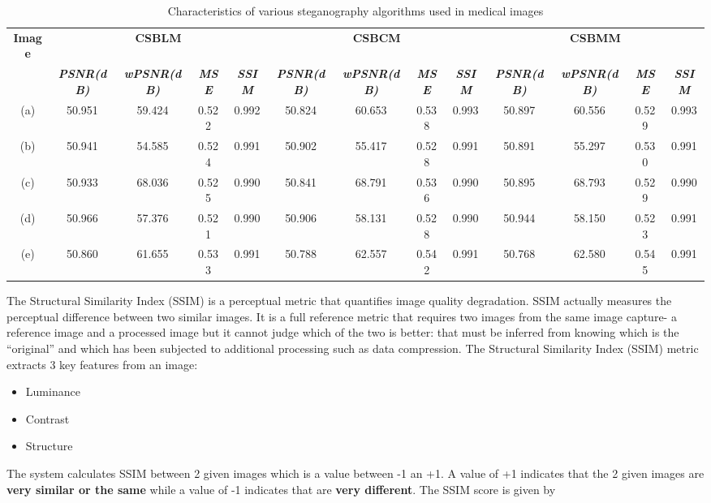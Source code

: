 \documentclass[conference]{IEEEtran}
\begin{document}
\begin{table}[htbp]
	\caption{Characteristics of various steganography algorithms used in medical images}
	\centering
		\begin{tabular}{ |c|c|c|c|c|c|c|c|c|c|c|c|c| }
			\hline
			\textbf{Image}&\multicolumn{4}{|c|}{\textbf{CSBLM}}&\multicolumn{4}{|c|}{\textbf{CSBCM}}&\multicolumn{4}{|c|}{\textbf{CSBMM}}\\
			\cline{2-13}
			\textbf{} & \textbf{\textit{PSNR(dB)}}& \textbf{\textit{wPSNR(dB)}}& \textbf{\textit{MSE}}& \textbf{\textit{SSIM}}& \textbf{\textit{PSNR(dB)}}& \textbf{\textit{wPSNR(dB)}}& \textbf{\textit{MSE}} & \textbf{\textit{SSIM}} & \textbf{\textit{PSNR(dB)}}& \textbf{\textit{wPSNR(dB)}}& \textbf{\textit{MSE}} & \textbf{\textit{SSIM}} \\
			\hline
			(a) & 50.951 & 59.424 & 0.522 & 0.992 & 50.824 & 60.653 & 0.538 & 0.993 & 50.897 & 60.556 &	0.529 & 0.993\\
			(b) & 50.941 & 54.585 &	0.524 & 0.991 & 50.902 & 55.417	& 0.528 & 0.991 & 50.891 & 55.297	& 0.530 & 0.991\\
			(c) & 50.933 & 68.036 &	0.525 & 0.990 & 50.841 & 68.791 &	0.536 & 0.990 & 50.895 & 68.793 &	0.529 & 0.990\\
			(d) & 50.966 & 57.376 &	0.521 & 0.990 & 50.906 & 58.131	& 0.528 & 0.990 & 50.944 & 58.150	& 0.523 & 0.991\\
			(e) & 50.860 & 61.655	& 0.533 & 0.991 & 50.788 & 62.557	& 0.542 & 0.991 & 50.768 & 62.580	& 0.545 & 0.991\\
			\hline
		\end{tabular}
	\label{tab:Characteristics}
\end{table}
\indent The Structural Similarity Index (SSIM) is a perceptual metric that quantifies image quality degradation. SSIM actually measures the perceptual difference between two similar images. It is a full reference metric that requires two images from the same image capture- a reference image and a processed image but it cannot judge which of the two is better: that must be inferred from knowing which is the “original” and which has been subjected to additional processing such as data compression. The Structural Similarity Index (SSIM) metric extracts 3 key features from an image:
\begin{itemize}
	\item Luminance
	\item Contrast
	\item Structure
\end{itemize}
The system calculates SSIM between 2 given images which is a value between -1 an +1. A value of +1 indicates that the 2 given images are \textbf{very similar or the same} while a value of -1 indicates that are \textbf{very different}. The SSIM score is given by 
\end{document}
